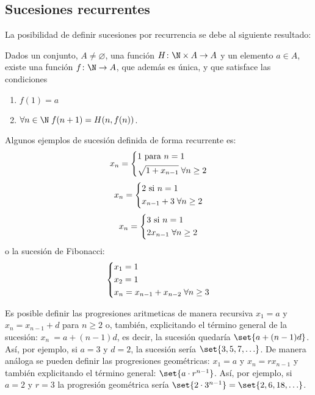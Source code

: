 \subsection{Sucesiones recurrentes}
La posibilidad de definir sucesiones por recurrencia se debe al siguiente resultado:
\begin{theorem}
	Dados un conjunto, \(A \neq \varnothing \), una función \(H \colon \N \times A \to A \) y un elemento \(a \in A \), existe una función \(f \colon \N \to A \), que además es única, y que satisface las condiciones
	\begin{enumerate}
		\item \(f(1) = a \)
		\item \(\forall n \in \N \; f(n + 1) = H(n, f(n ))\).
	\end{enumerate}
\end{theorem}
\pagebreak
\begin{example}
	Algunos ejemplos de sucesión definida de forma recurrente es:
	\[
		x_n = \begin{dcases}
			1 \text{ para } n = 1 \\
			\sqrt{1 + x_{n-1}} \; \forall n \geq 2
		\end{dcases}
	\]
	\[
		x_n = \begin{dcases}
			2 \text{ si } n = 1 \\
			x_{n-1} + 3 \; \forall n \geq 2
		\end{dcases}
	\]
	\[
		x_n = \begin{dcases}
			3 \text{ si } n = 1 \\
			2 x_{n-1} \; \forall n \geq 2
		\end{dcases}
	\]
	o la sucesión de Fibonacci:
	\[
		\begin{dcases}
			x_1 = 1 \\
			x_2 = 1 \\
			x_n = x_{n-1} + x_{n-2} \; \forall n \geq 3
		\end{dcases}
	\]
\end{example}
Es posible definir las progresiones aritmeticas de manera recursiva \(x_1 = a \) y \(x_n = x_{n-1} + d \) para \(n \geq  2 \) o, también, explicitando el término general de la sucesión: \(x_n\ = a + (n-1)d\), es decir, la sucesión quedaría \(\set{a + (n-1)d }\). Así, por ejemplo, si \(a = 3 \) y \(d = 2 \), la sucesión sería \(\set{3,5,7,\ldots }\). De manera análoga se pueden definir las progresiones geométricas: \(x_1 = a \) y \(x_n = rx_{n-1}\) y también explicitando el término general: \(\set{a \cdot r^{n-1 } }\). Así, por ejemplo, si \(a = 2 \) y \(r = 3 \) la progresión geométrica sería \(\set{2 \cdot 3^{n-1} } = \set{2,6,18,\ldots}\).

